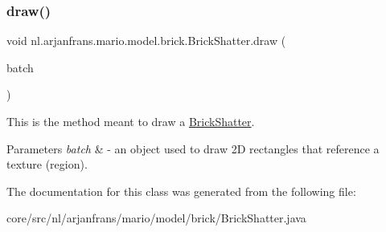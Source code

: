 \subsubsection{\texorpdfstring{draw()}{draw()}}
{\footnotesize\ttfamily void nl.\+arjanfrans.\+mario.\+model.\+brick.\+Brick\+Shatter.\+draw (\begin{DoxyParamCaption}\item[{Batch}]{batch }\end{DoxyParamCaption})}



This is the method meant to draw a \hyperlink{classnl_1_1arjanfrans_1_1mario_1_1model_1_1brick_1_1BrickShatter}{Brick\+Shatter}. 


\begin{DoxyParams}{Parameters}
{\em batch} & -\/ an object used to draw 2D rectangles that reference a texture (region). \\
\hline
\end{DoxyParams}


The documentation for this class was generated from the following file\+:\begin{DoxyCompactItemize}
\item 
core/src/nl/arjanfrans/mario/model/brick/Brick\+Shatter.\+java\end{DoxyCompactItemize}
